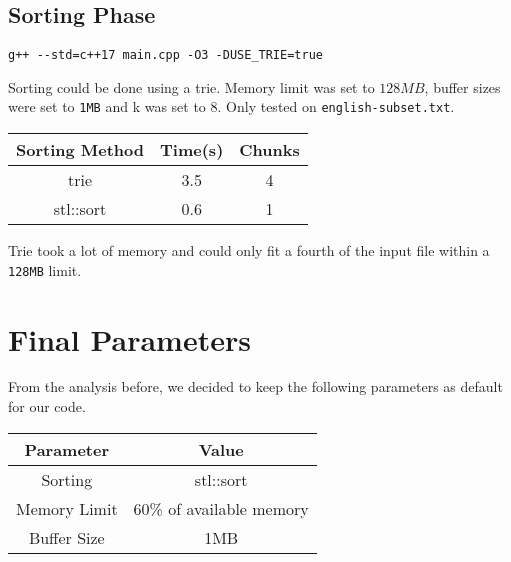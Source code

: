\documentclass{article}
\begin{document}
\subsection{Sorting Phase}
\begin{lstlisting}[style = cpp]
g++ --std=c++17 main.cpp -O3 -DUSE_TRIE=true
\end{lstlisting}
Sorting could be done using a trie. Memory limit was set to $128MB$, buffer sizes were set to \verb|1MB| and k was set to $8$. Only tested on \verb|english-subset.txt|.
\begin{center}
\begin{tabular}{||c c c||} 
 \hline
Sorting Method & Time(s) & Chunks \\ [0.5ex] 
 \hline\hline
 trie & 3.5 & 4\\ 
 \hline
 stl::sort & 0.6 &1\\ 
 \hline
\end{tabular}
\end{center}
Trie took a lot of memory and could only fit a fourth of the input file within a \verb|128MB| limit.
\section{Final Parameters}
From the analysis before, we decided to keep the following parameters as default for our code.
\begin{center}
\begin{tabular}{||c c||} 
 \hline
Parameter & Value \\ [0.5ex] 
 \hline\hline
 Sorting & stl::sort\\ 
 \hline
 Memory Limit & 60\% of available memory\\ 
 \hline
 Buffer Size & 1MB\\ 
 \hline
\end{tabular}
\end{center}
\end{document}

